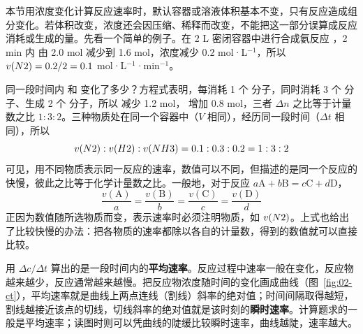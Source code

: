 本节用浓度变化计算反应速率时，默认容器或溶液体积基本不变，只有反应造成组分变化。若体积改变，浓度还会因压缩、稀释而改变，不能把这一部分误算成反应消耗或生成的量。先看一个简单的例子。在 2 L 密闭容器中进行合成氨反应 ，2 min 内  由 2.0 mol 减少到 1.6 mol，浓度减少 0.2 mol·L$^{-1}$，所以 $v(N2)=0.2/2=0.1$ mol·L$^{-1}$·min$^{-1}$。

同一段时间内  和  变化了多少？方程式表明，每消耗 1 个  分子，同时消耗 3 个  分子、生成 2 个  分子，所以  减少 1.2 mol， 增加 0.8 mol，三者 $\Delta n$ 之比等于计量数之比 $1:3:2$。三种物质处在同一个容器中（$V$ 相同），经历同一段时间（$\Delta t$ 相同），所以
\[v(N2):v(H2):v(NH3)=0.1:0.3:0.2=1:3:2\]
可见，用不同物质表示同一反应的速率，数值可以不同，但描述的是同一个反应的快慢，彼此之比等于化学计量数之比。一般地，对于反应 $a\mathrm{A}+b\mathrm{B}=c\mathrm{C}+d\mathrm{D}$，
\[\frac{v(\mathrm{A})}{a}=\frac{v(\mathrm{B})}{b}=\frac{v(\mathrm{C})}{c}=\frac{v(\mathrm{D})}{d}\]
正因为数值随所选物质而变，表示速率时必须注明物质，如 $v(N2)$。上式也给出了比较快慢的办法：把各物质的速率都除以各自的计量数，得到的数值就可以直接比较。

用 $\Delta c/\Delta t$ 算出的是一段时间内的\textbf{平均速率}。反应过程中速率一般在变化，反应物越来越少，反应通常越来越慢。把反应物浓度随时间的变化画成曲线（图~\ref{fig:02-ct}），平均速率就是曲线上两点连线（割线）斜率的绝对值；时间间隔取得越短，割线越接近该点的切线，切线斜率的绝对值就是该时刻的\textbf{瞬时速率}。计算题求的一般是平均速率；读图时则可以凭曲线的陡缓比较瞬时速率，曲线越陡，速率越大。


